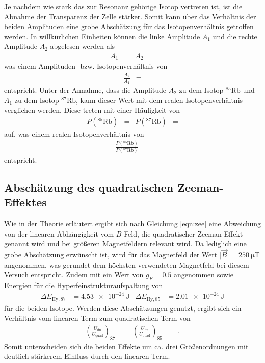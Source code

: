 Je nachdem wie stark das zur Resonanz gehörige Isotop vertreten ist, ist die Abnahme der Transparenz der Zelle stärker.
Somit kann über das Verhältnis der beiden Amplituden eine grobe Abschätzung für das Isotopenverhältnis getroffen werden.
In willkürlichen Einheiten können die linke Amplitude $A_1$ und die rechte Amplitude $A_2$ abgelesen werden als
\begin{align*}
  A_1 &=  & A_2 &= 
\end{align*}
was einem Amplituden- bzw. Isotopenverhältnis von
\begin{align*}
  \frac{A_2}{A_1} &= 
\end{align*}
entspricht.
Unter der Annahme, dass die Amplitude $A_2$ zu dem Isotop $^{85}\text{Rb}$ und $A_1$ zu dem Isotop $^{87}\text{Rb}$, kann dieser Wert mit dem realen Isotopenverhältnis \cite{fuck} verglichen werden.
Diese treten mit einer Häufigkeit von
\begin{align*}
  P\left(^{85}\text{Rb}\right) &=  & P\left(^{87}\text{Rb}\right) &= 
\end{align*}
auf, was einem realen Isotopenverhältnis von
\begin{align*}
  \frac{P\left(^{85}\text{Rb}\right)}{P\left(^{87}\text{Rb}\right)} &= 
\end{align*}
entspricht.

\subsection{Abschätzung des quadratischen Zeeman-Effektes}
Wie in der Theorie erläutert ergibt sich nach Gleichung \eqref{eqn:zee} eine Abweichung von der linearen Abhängigkeit vom $B$-Feld, die quadratischer Zeeman-Effekt genannt wird und bei größeren Magnetfeldern relevant wird.
Da lediglich eine grobe Abschätzung erwünscht ist, wird für das Magnetfeld der Wert $\lvert \vec{B} \rvert = \SI{250}{\micro\tesla}$ angenommen, was gerundet dem höchsten verwendeten Magnetfeld bei diesem Versuch entspricht.
Zudem mit ein Wert von $g_F = \num{0.5}$ angenommen sowie Energien für die Hyperfeinstrukturaufspaltung \cite{skript} von
\begin{align*}
  \Delta E_{\text{Hy},87} &= \SI{4.53e-24}{\joule} & \Delta E_{\text{Hy}, 85} &= \SI{2.01e-24}{\joule}
\end{align*}
für die beiden Isotope.
Werden diese Abschätzungen genutzt, ergibt sich ein Verhältnis vom linearen Term zum quadratischen Term von
\begin{align*}
  \left(\frac{U_\text{lin}}{U_\text{quad}}\right)_{87} &=  & \left(\frac{U_\text{lin}}{U_\text{quad}}\right)_{85} &= .
\end{align*}
Somit unterscheiden sich die beiden Effekte um ca. drei Größenordnungen mit deutlich stärkerem Einfluss durch den linearen Term.


